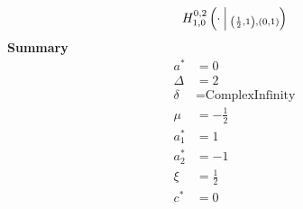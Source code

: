 \documentclass{article}
\newcommand{\FoxH}[5]{H_{#2}^{#1}\left(#3\:\middle\vert\: \begin{subarray}{l}#4\\[0.4em] #5\end{subarray}\right)}
\begin{document}
\begin{align*}
\FoxH{0,2}{1,0}{\cdot}{}{\left(\frac{1}{2}, 1\right), \left(0, 1\right)}
\end{align*}
\noindent\textbf{Summary}
\begin{align*}
a^* &= 0 \\
\Delta &= 2 \\
\delta &= \text{ComplexInfinity} \\
\mu &= -\frac{1}{2} \\
a_1^* &= 1 \\
a_2^* &= -1 \\
\xi &= \frac{1}{2} \\
c^* &= 0 \\
\end{align*}
\end{document}
